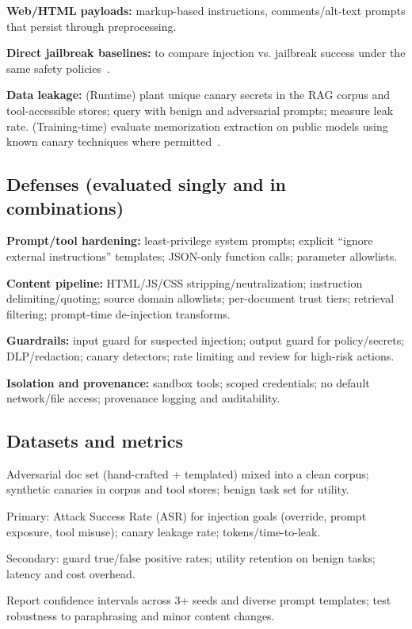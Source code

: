 \documentclass[11pt]{article}
\begin{document}
\textbf{Web/HTML payloads:} markup-based instructions, comments/alt-text prompts that persist through preprocessing.

\textbf{Direct jailbreak baselines:} to compare injection vs. jailbreak success under the same safety policies~\cite{zou2023universal}.

\textbf{Data leakage:} (Runtime) plant unique canary secrets in the RAG corpus and tool-accessible stores; query with benign and adversarial prompts; measure leak rate. (Training-time) evaluate memorization extraction on public models using known canary techniques where permitted~\cite{carlini2021extracting,carlini2022quantifying}.

\subsection{Defenses (evaluated singly and in combinations)}
\textbf{Prompt/tool hardening:} least-privilege system prompts; explicit ``ignore external instructions'' templates; JSON-only function calls; parameter allowlists.

\textbf{Content pipeline:} HTML/JS/CSS stripping/neutralization; instruction delimiting/quoting; source domain allowlists; per-document trust tiers; retrieval filtering; prompt-time de-injection transforms.

\textbf{Guardrails:} input guard for suspected injection; output guard for policy/secrets; DLP/redaction; canary detectors; rate limiting and review for high-risk actions.

\textbf{Isolation and provenance:} sandbox tools; scoped credentials; no default network/file access; provenance logging and auditability.

\subsection{Datasets and metrics}
Adversarial doc set (hand-crafted + templated) mixed into a clean corpus; synthetic canaries in corpus and tool stores; benign task set for utility.

Primary: Attack Success Rate (ASR) for injection goals (override, prompt exposure, tool misuse); canary leakage rate; tokens/time-to-leak.

Secondary: guard true/false positive rates; utility retention on benign tasks; latency and cost overhead.

Report confidence intervals across 3+ seeds and diverse prompt templates; test robustness to paraphrasing and minor content changes.
\end{document}
